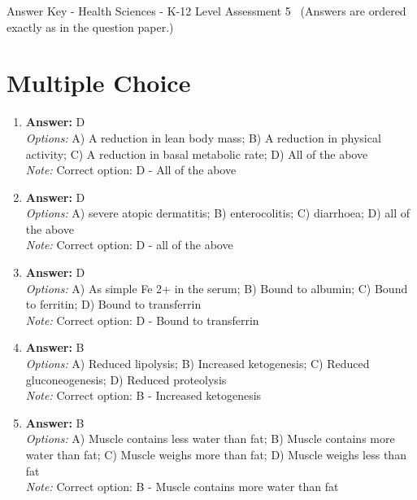\documentclass[12pt]{article}
\begin{document}
\begin{center}
Answer Key - Health Sciences - K-12 Level Assessment 5 \
\small (Answers are ordered exactly as in the question paper.)
\end{center}

\section*{Multiple Choice}
\begin{enumerate}[label=\arabic*.]
\item \textbf{Answer:} D
\\ \textit{Options:} A) A reduction in lean body mass; B) A reduction in physical activity; C) A reduction in basal metabolic rate; D) All of the above
\\ \textit{Note:} Correct option: D - All of the above
\item \textbf{Answer:} D
\\ \textit{Options:} A) severe atopic dermatitis; B) enterocolitis; C) diarrhoea; D) all of the above
\\ \textit{Note:} Correct option: D - all of the above
\item \textbf{Answer:} D
\\ \textit{Options:} A) As simple Fe 2+ in the serum; B) Bound to albumin; C) Bound to ferritin; D) Bound to transferrin
\\ \textit{Note:} Correct option: D - Bound to transferrin
\item \textbf{Answer:} B
\\ \textit{Options:} A) Reduced lipolysis; B) Increased ketogenesis; C) Reduced gluconeogenesis; D) Reduced proteolysis
\\ \textit{Note:} Correct option: B - Increased ketogenesis
\item \textbf{Answer:} B
\\ \textit{Options:} A) Muscle contains less water than fat; B) Muscle contains more water than fat; C) Muscle weighs more than fat; D) Muscle weighs less than fat
\\ \textit{Note:} Correct option: B - Muscle contains more water than fat
\end{enumerate}
\end{document}
